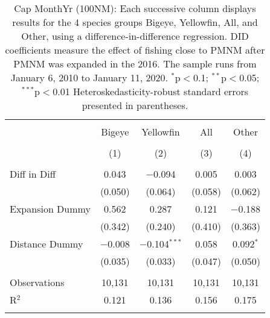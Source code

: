 
\begin{table}[!htbp] \centering 
  \caption{Cap MonthYr (100NM): Each successive column displays results for the 4 species groups Bigeye, Yellowfin, All, and Other, using a difference-in-difference regression. DID coefficients measure the effect of fishing close to PMNM after PMNM was expanded in the 2016. The sample runs from January 6, 2010 to January 11, 2020. $^{*}$p$<$0.1; $^{**}$p$<$0.05; $^{***}$p$<$0.01 Heteroskedasticity-robust standard errors presented in parentheses.} 
  \label{tbl:timeFE100NM} 
\begin{tabular}{@{\extracolsep{5pt}}lcccc} 
\\[-1.8ex]\hline 
\hline \\[-1.8ex] 
 & Bigeye & Yellowfin & All & Other \\ 
\\[-1.8ex] & (1) & (2) & (3) & (4)\\ 
\hline \\[-1.8ex] 
 Diff in Diff & 0.043 & $-$0.094 & 0.005 & 0.003 \\ 
  & (0.050) & (0.064) & (0.058) & (0.062) \\ 
  Expansion Dummy & 0.562 & 0.287 & 0.121 & $-$0.188 \\ 
  & (0.342) & (0.240) & (0.410) & (0.363) \\ 
  Distance Dummy & $-$0.008 & $-$0.104$^{***}$ & 0.058 & 0.092$^{*}$ \\ 
  & (0.035) & (0.033) & (0.047) & (0.050) \\ 
 \hline \\[-1.8ex] 
Observations & 10,131 & 10,131 & 10,131 & 10,131 \\ 
R$^{2}$ & 0.121 & 0.136 & 0.156 & 0.175 \\ 
\hline 
\hline \\[-1.8ex] 
\end{tabular} 
\end{table} 
